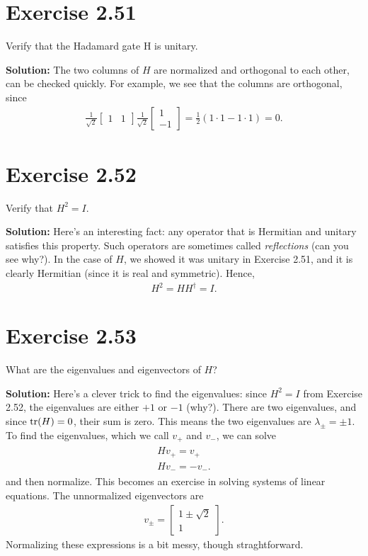 \documentclass{book}
\begin{document}
\section*{Exercise 2.51}
    Verify that the Hadamard gate H is unitary.
    
    \textbf{Solution:} The two columns of $H$ are normalized and orthogonal to each other, can be checked quickly. For example, we see that the columns are orthogonal, since
    \begin{align}
        \frac{1}{\sqrt{2}}\begin{bmatrix}
            1 & 1
        \end{bmatrix} \frac{1}{\sqrt{2}} \begin{bmatrix}
            1 \\
            -1
        \end{bmatrix} = \frac{1}{2}(1\cdot 1 - 1\cdot 1) = 0.
    \end{align}
    
\section*{Exercise 2.52}
    Verify that $H^2 = I$.
    
    \textbf{Solution:} Here's an interesting fact: any operator that is Hermitian and unitary satisfies this property. Such operators are sometimes called \emph{reflections} (can you see why?). In the case of $H$, we showed it was unitary in Exercise 2.51, and it is clearly Hermitian (since it is real and symmetric). Hence,
    \begin{align}
        H^2 = H H^\dagger = I.
    \end{align}
    
\section*{Exercise 2.53}
    What are the eigenvalues and eigenvectors of $H$?
    
    \textbf{Solution:} Here's a clever trick to find the eigenvalues: since $H^2 = I$ from Exercise 2.52, the eigenvalues are either $+1$ or $-1$ (why?). There are two eigenvalues, and since $\tr(H) = 0$, their sum is zero. This means the two eigenvalues are $\lambda_{\pm} = \pm 1$. To find the eigenvalues, which we call $v_+$ and $v_-$, we can solve 
    \begin{align}
    \begin{aligned}
        H v_+ = v_+ \\
        H v_- = -v_-.
    \end{aligned}
    \end{align}
    and then normalize. This becomes an exercise in solving systems of linear equations. The unnormalized eigenvectors are 
    \begin{align}
        v_{\pm} = \begin{bmatrix}
            1 \pm \sqrt{2} \\
            1
        \end{bmatrix}.
    \end{align}
    Normalizing these expressions is a bit messy, though straghtforward.
    
\end{document}

